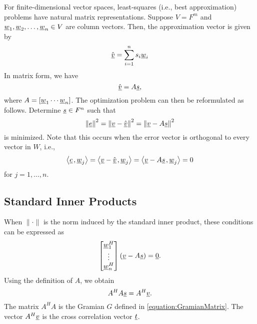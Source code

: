 For finite-dimensional vector spaces, least-squares (i.e., best approximation) problems have natural matrix representations.
Suppose $V = F^m$ and $\underline{w}_1, \underline{w}_2, \ldots, \underline{w}_n \in V$ are column vectors.
Then, the approximation vector is given by
\begin{equation*}
\hat{\underline{v}} = \sum_{i=1}^n s_i \underline{w}_i
\end{equation*}
In matrix form, we have
\begin{equation*}
\hat{\underline{v}} = A \underline{s},
\end{equation*}
where $A = \left[ \underline{w}_1 \cdots \underline{w}_n \right]$.
The optimization problem can then be reformulated as follows.
Determine $\underline{s} \in F^n$ such that
\begin{equation*}
\left\| \underline{e} \right\|^2
= \left\| \underline{v} - \hat{\underline{v}} \right\|^2
= \left\| \underline{v} - A \underline{s} \right\|^2
\end{equation*}
is minimized.
Note that this occurs when the error vector is orthogonal to every vector in $W$, i.e.,
\begin{equation*}
{\left\langle  \underline{e}  \mskip2mu ,  \underline{w}_j  \right\rangle}
= {\left\langle  \underline{v} - \hat{\underline{v}}  \mskip2mu ,  \underline{w}_j  \right\rangle}
= {\left\langle  \underline{v} - A \underline{s}  \mskip2mu ,  \underline{w}_j  \right\rangle}
= 0
\end{equation*}
for $j = 1, \ldots, n$.


\subsection{Standard Inner Products}

When $\| \cdot \|$ is the norm induced by the standard inner product, these conditions can be expressed as
\begin{equation*}
\begin{bmatrix} \underline{w}_1^H \\ \vdots \\ \underline{w}_n^H \end{bmatrix} \left( \underline{v} - A \underline{s} \right) = \underline{0} .
\end{equation*}
Using the definition of $A$, we obtain
\begin{equation*}
A^H A \underline{s} = A^H \underline{v} .
\end{equation*}
The matrix $A^H A$ is the Gramian $G$ defined in \eqref{equation:GramianMatrix}.
The vector $A^H \underline{v}$ is the cross correlation vector $\underline{t}$.

